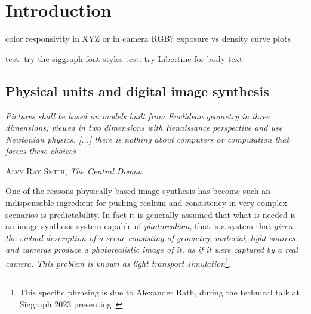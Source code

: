 
\chapter{Introduction}


\ifomit


color responsivity in XYZ or in camera RGB?
exposure vs density curve plots




test: try the siggraph font styles
test: try Libertine for body text

\fi

\section{Physical units and digital image synthesis}
%
\epigraph{%
	\emph{Pictures shall be based on models built from Euclidean geometry
		in three dimensions, viewed in two dimensions with Renaissance perspective
		and use Newtonian physics. [...] 
		there is nothing about computers or computation that forces these choices}}
		{\textsc{Alvy Ray Smith}, \emph{The Central Dogma}}

\noindent One of the reasons physically-based image synthesis has become such an
indispensable ingredient for pushing realism and consistency in very
complex scenarios is predictability. 
In fact it is generally assumed that what is needed is an image synthesis system
capable of \emph{photorealism}, that is a system that \emph{given the virtual 
	description of a scene consisting of geometry, material, light sources and cameras
	produce a photorealistic image of it, as if it were captured by a real camera.
	This problem is known as light transport simulation}\footnote{
	This specific phrasing is due to Alexander Rath, during the technical talk at 
	Siggraph 2023 presenting~\cite{rath23}}.

